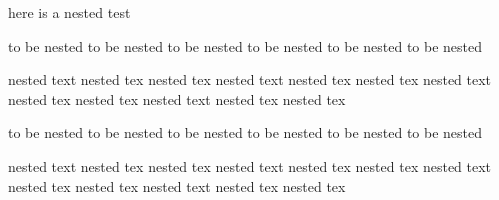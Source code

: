 here is a nested test
\begin{one}
	to be nested to be nested
	to be nested to be nested
	to be nested to be nested
	\begin{two}
		nested text nested tex nested tex
		nested text nested tex nested tex
		nested text nested tex nested tex
		nested text nested tex nested tex
	\end{two}
\end{one}
\begin{one}
	to be nested to be nested
	to be nested to be nested
	to be nested to be nested
	\begin{two}
		nested text nested tex nested tex
		nested text nested tex nested tex
		nested text nested tex nested tex
		nested text nested tex nested tex
	\end{two}
\end{one}
